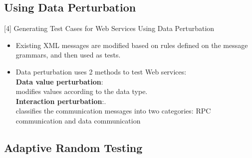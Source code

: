 \documentclass[10pt]{beamer}
\begin{document}
\subsection{Using Data Perturbation}
\begin{frame}{[4] Generating Test Cases for Web Services Using Data Perturbation}
	\begin{itemize}
		\item Existing XML messages are modified based on rules defined on the message grammars, and then used as tests.
		\item Data perturbation uses 2 methods to test Web services:\\ \textbf{Data value perturbation}:\\ modifies values according to the data type.\\\textbf{Interaction perturbation}:.\\classifies the communication messages into two categories: RPC communication and data communication

	\end{itemize}
\end{frame}

%
\subsection{Adaptive Random Testing}
\end{document}
